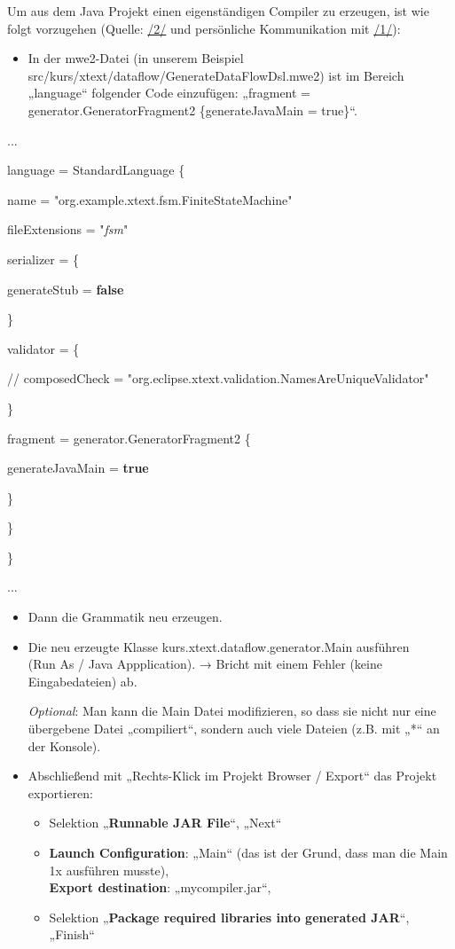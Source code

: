 \documentclass[]{article}
\providecommand{\tightlist}{%
  \setlength{\itemsep}{0pt}\setlength{\parskip}{0pt}}
\begin{document}
Um aus dem Java Projekt einen eigenständigen Compiler zu erzeugen, ist
wie folgt vorzugehen (Quelle: \protect\hyperlink{anchor-2}{/2/} und
persönliche Kommunikation mit \protect\hyperlink{anchor-1}{/1/}):

\begin{itemize}
\tightlist
\item
  In der mwe2-Datei (in unserem Beispiel
  src/kurs/xtext/dataflow/GenerateDataFlowDsl.mwe2) ist im Bereich
  „language`` folgender Code einzufügen: „fragment =
  generator.GeneratorFragment2 \{generateJavaMain = true\}``.
\end{itemize}

...

language = StandardLanguage \{

name = "org.example.xtext.fsm.FiniteStateMachine"

fileExtensions = "\emph{fsm}"

serializer = \{

generateStub = \textbf{false}

\}

validator = \{

// composedCheck =
"org.eclipse.xtext.validation.NamesAreUniqueValidator"

\}

fragment = generator.GeneratorFragment2 \{

generateJavaMain = \textbf{true}

\}

\}

\}

...

\begin{itemize}
\item
  Dann die Grammatik neu erzeugen.
\item
  Die neu erzeugte Klasse kurs.xtext.dataflow.generator.Main ausführen\\
  (Run As / Java Appplication). → Bricht mit einem Fehler (keine
  Eingabedateien) ab.

  \emph{Optional}: Man kann die Main Datei modifizieren, so dass sie
  nicht nur eine übergebene Datei „compiliert``, sondern auch viele
  Dateien (z.B. mit „*`` an der Konsole).
\item
  Abschließend mit „Rechts-Klick im Projekt Browser / Export`` das
  Projekt exportieren:

  \begin{itemize}
  \tightlist
  \item
    Selektion „\textbf{Runnable JAR File}``, „Next``
  \item
    \textbf{Launch Configuration}: „Main`` (das ist der Grund, dass man
    die Main 1x ausführen musste),\\
    \textbf{Export destination}: „mycompiler.jar``, 
  \item
    Selektion „\textbf{Package required libraries into generated JAR}``,
    „Finish``
  \end{itemize}
\end{itemize}
\end{document}
